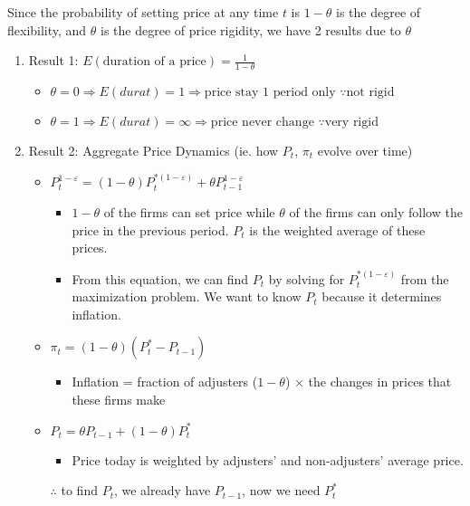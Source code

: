 \documentclass{article}
\begin{document}
Since the probability of setting price at any time $t$ is $1-\theta$ is the degree of flexibility, and $\theta$ is the degree of price rigidity, we have 2 results due to $\theta$
\begin{enumerate}
    \item Result 1: $E({\text{duration of a price}}) = \frac{1}{1-\theta}$
    \begin{itemize}
        \item $\theta = 0 \Rightarrow E(durat) = 1 \Rightarrow {\text{price stay 1 period only }} \because {\text{not rigid}}$
        \item $\theta = 1 \Rightarrow E(durat) = \infty \Rightarrow {\text{price never change }} \because {\text{very rigid}}$\\
    \end{itemize}

    \item Result 2: Aggregate Price Dynamics (ie. how $P_t$, $\pi_t$ evolve over time)
    \begin{itemize} 
        \item $P_t^{1-\varepsilon} = (1-\theta)P_t^{*(1-\varepsilon)} + \theta P_{t-1}^{1-\varepsilon}$
        \begin{itemize}
            \item $1-\theta$ of the firms can set price while $\theta$ of the firms can only follow the price in the previous period. $P_t$ is the weighted average of these prices.
            \item From this equation, we can find $P_t$ by solving for $P_t^{*(1-\varepsilon)}$ from the maximization problem. We want to know $P_t$ because it determines inflation.
        \end{itemize}

        \item $\pi_t = (1-\theta)(P_t^* - P_{t-1})$
        \begin{itemize}
            \item Inflation = fraction of adjusters ($1-\theta$) $\times$ the changes in prices that these firms make
        \end{itemize}

        \item $P_t = \theta P_{t-1} + (1-\theta)P_t^*$
        \begin{itemize}
            \item Price today is weighted by adjusters' and non-adjusters' average price.
        \end{itemize}
        $\therefore$ to find $P_t$, we already have $P_{t-1}$, now we need $P_t^*$
    \end{itemize}
    
\end{enumerate}
\end{document}
